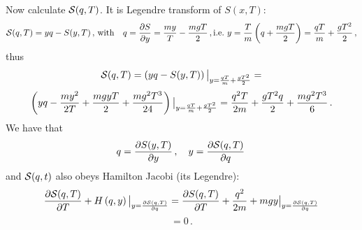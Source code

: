 Now calculate $\S(q,T)$.
It is Legendre transform of $S(x,T)$:
      $$
\S(q,T)=yq-S(y,T)\,, \, {\rm with}\quad
     q={\p S\over \p y}=
{my\over T}-{mgT\over 2}\,, {\rm i.e.}\,\,
        y={T\over m}\left(q+{mgT\over 2}\right)=
         {qT\over m}+{gT^2\over 2}\,,
       $$
thus
       $$
\S(q,T)=\left(yq-S(y,T)\right)\big\vert_
     {
y={qT\over m}+{gT^2\over 2}
      }=
        $$
      $$
   \left(yq-
{my^2\over 2T}+{mgyT\over 2}+{mg^2T^3\over 24}
\right)\big\vert_
     {
y={qT\over m}+{gT^2\over 2}
      }
    =
{q^2T\over 2m}+{gT^2q\over 2}+{mg^2T^3\over 6}\,.
       $$ 
We have that
       $$
q={\p S(y,T)\over \p y}\,,\quad
y={\p \S(q,T)\over \p q}\,
       $$
and  $\S(q,t)$  also obeys Hamilton Jacobi
(its Legendre):
          $$
  {\p \S(q,T)\over \p T}+H
              \left(
    q,y
          \right)\big\vert_
{y={\p \S(q,T)\over \p q}}
           =
   {\p S(q,T)\over \p T}+
             {q^2\over 2m} 
       +mgy\big\vert_{
    y={\p \S(q,T)\over \p q}
           }
        $$
     $$
=0\,.
      $$


\bye
